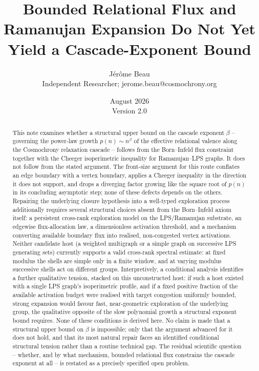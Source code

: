 \documentclass[11pt,a4paper]{article}
\title{Bounded Relational Flux and Ramanujan Expansion Do Not Yet Yield a Cascade-Exponent Bound}
\author{J\'er\^ome Beau\\
\small Independent Researcher; jerome.beau@cosmochrony.org}
\date{August 2026\\[2pt]\small Version 2.0}
\theoremstyle{definition}
\theoremstyle{remark}
\begin{document}
  \maketitle

  \begin{abstract}
    This note examines whether a structural upper bound on the cascade exponent $\beta$ --
    governing the power-law growth $p(n) \sim n^\beta$ of the effective relational valence
    along the Cosmochrony relaxation cascade -- follows from the Born--Infeld flux constraint
    together with the Cheeger isoperimetric inequality for Ramanujan--LPS graphs.
    It does not follow from the stated argument.
    The front-size argument for this route conflates an edge boundary with a vertex boundary,
    applies a Cheeger inequality in the direction it does not support, and drops a diverging
    factor growing like the square root of $p(n)$ in its concluding asymptotic step; none of
    these defects depends on the others.
    Repairing the underlying closure hypothesis into a well-typed exploration process
    additionally requires several structural choices absent from the Born--Infeld axiom
    itself: a persistent cross-rank exploration model on the LPS/Ramanujan substrate, an
    edgewise flux-allocation law, a dimensionless activation threshold, and a mechanism
    converting available boundary flux into realised, non-congested vertex activations.
    Neither candidate host (a weighted multigraph or a simple graph on successive LPS
    generating sets) currently supports a valid cross-rank spectral estimate: at fixed
    modulus the shells are simple only in a finite window, and at varying modulus successive
    shells act on different groups.
    Interpretively, a conditional analysis identifies a further qualitative tension, stacked
    on this unconstructed host: if such a host existed with a single LPS graph's
    isoperimetric profile, and if a fixed positive fraction of the available activation
    budget were realised with target congestion uniformly bounded, strong expansion would
    favour fast, near-geometric exploration of the underlying group, the qualitative opposite
    of the slow polynomial growth a structural exponent bound requires.
    None of these conditions is derived here.
    No claim is made that a structural upper bound on $\beta$ is impossible; only that the
    argument advanced for it does not hold, and that its most natural repair faces an
    identified conditional structural tension rather than a routine technical gap.
    The residual scientific question -- whether, and by what mechanism, bounded relational
    flux constrains the cascade exponent at all -- is restated as a precisely specified open
    problem.
  \end{abstract}
\end{document}
